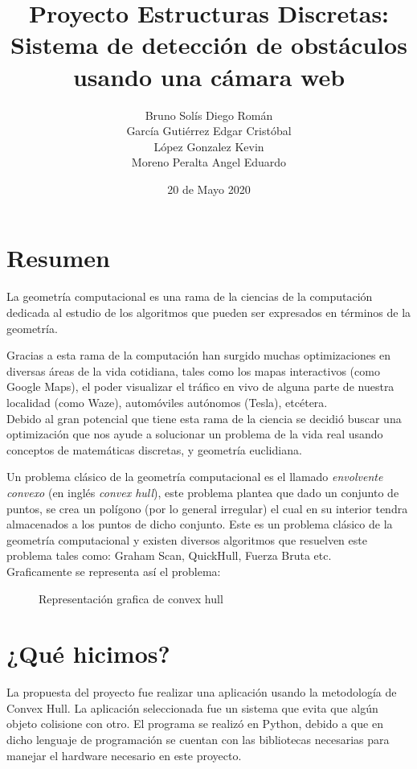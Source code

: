 \documentclass[11pt]{article}
\title{Proyecto Estructuras Discretas: Sistema de detección de obstáculos usando una cámara web}
\author{Bruno Solís Diego Román\\García Gutiérrez Edgar Cristóbal\\López Gonzalez Kevin\\Moreno Peralta Angel Eduardo }
\date{20 de Mayo 2020}
\begin{document}
\maketitle
\section{Resumen}
La geometría computacional es una rama de la ciencias de la computación dedicada al estudio de los algoritmos que pueden ser expresados en términos de la geometría.

Gracias a esta rama de la computación han surgido muchas optimizaciones en diversas áreas de la vida cotidiana, tales como los mapas interactivos (como Google Maps), el poder visualizar el tráfico en vivo de alguna parte de nuestra localidad (como Waze), automóviles autónomos (Tesla), etcétera.\\
Debido al gran potencial que tiene esta rama de la ciencia se decidió buscar una optimización que nos ayude a solucionar un problema de la vida real usando conceptos de matemáticas discretas, y geometría euclidiana.

Un problema clásico de la geometría computacional es el llamado \textit{envolvente convexo} (en inglés \textit{convex hull}), este problema plantea que dado un conjunto de puntos, se crea un polígono (por lo general irregular) el cual en su interior tendra almacenados a los puntos de dicho conjunto. Este es un problema clásico de la geometría computacional y existen diversos algoritmos que resuelven este problema tales como: Graham Scan, QuickHull, Fuerza Bruta etc.\\
Graficamente se representa así el problema:\\
\begin{figure}
\centering
\caption{Representación grafica de convex hull}
\end{figure}



\section{¿Qué hicimos?}
La propuesta del proyecto fue realizar una aplicación usando la metodología de Convex Hull. La aplicación seleccionada fue un sistema que evita que algún objeto colisione con otro. El programa se realizó en Python, debido a que en dicho lenguaje de programación se cuentan con las bibliotecas necesarias para manejar el hardware necesario en este proyecto.
\end{document}
